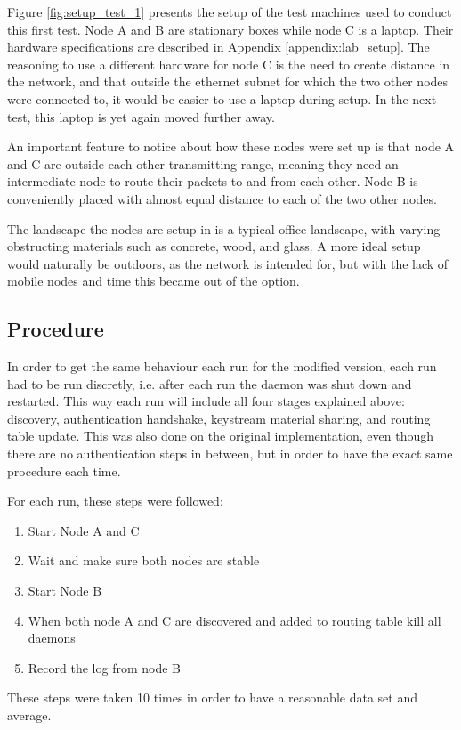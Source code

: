 Figure \ref{fig:setup_test_1} presents the setup of the test machines used to
conduct this first test. Node A and B are stationary boxes while node C is a
laptop. Their hardware specifications are described in Appendix
\ref{appendix:lab_setup}. The reasoning to use a different hardware for node C
is the need to create distance in the network, and that outside the ethernet
subnet for which the two other nodes were connected to, it would be easier to
use a laptop during setup. In the next test, this laptop is yet again moved
further away.

An important feature to notice about how these nodes were set up is that node A
and C are outside each other transmitting range, meaning they need an
intermediate node to route their packets to and from each other. Node B is
conveniently placed with almost equal distance to each of the two other nodes.

The landscape the nodes are setup in is a typical office landscape, with varying
obstructing materials such as concrete, wood, and glass. A more ideal setup
would naturally be outdoors, as the network is intended for, but with the lack
of mobile nodes and time this became out of the option.

\subsection{Procedure}
In order to get the same behaviour each run for the modified version, each run
had to be run discretly, i.e. after each run the daemon was shut down and
restarted. This way each run will include all four stages explained above:
discovery, authentication handshake, keystream material sharing, and routing
table update. This was also done on the original implementation, even though
there are no authentication steps in between, but in order to have the exact
same procedure each time.

For each run, these steps were followed:
\begin{enumerate}
  \item Start Node A and C
  \item Wait and make sure both nodes are stable
  \item Start Node B
  \item When both node A and C are discovered and added to routing table kill
  all daemons
  \item Record the log from node B
\end{enumerate}

These steps were taken 10 times in order to have a reasonable data set and
average.

